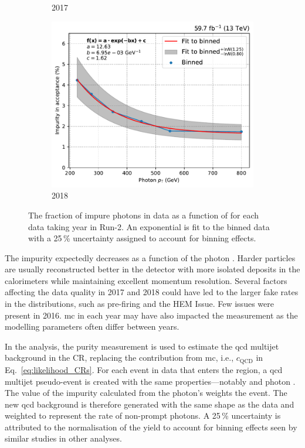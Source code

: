 \begin{figure}[ht]
\begin{subfigure}[b]{0.49\textwidth}
        \caption{2017}
    \end{subfigure}

    \begin{subfigure}[b]{0.49\textwidth}
        \includegraphics[width=\textwidth]{figures/photon_purity/2018/impurity_plot_2018.pdf}
        \caption{2018}
    \end{subfigure}
    \caption[The fraction of impure photons in data as a function of \pt for each data taking year in Run-2]{The fraction of impure photons in data as a function of \pt for each data taking year in Run-2. An exponential is fit to the binned data with a 25\,\% uncertainty assigned to account for binning effects.}
    \label{fig:htoinv_photon_impurity}
\end{figure}

The impurity expectedly decreases as a function of the photon \pt. Harder particles are usually reconstructed better in the detector with more isolated deposits in the calorimeters while maintaining excellent momentum resolution. Several factors affecting the data quality in 2017 and 2018 could have led to the larger fake rates in the distributions, such as pre-firing and the HEM Issue. Few issues were present in 2016. \acrlong{mc} in each year may have also impacted the measurement as the modelling parameters often differ between years.

In the analysis, the purity measurement is used to estimate the \acrshort{qcd} multijet background in the \singlePhotonCr \gls{CR}, replacing the contribution from \acrshort{mc}, i.e., $c_{\mathrm{QCD}}$ in Eq.~\ref{eq:likelihood_CRs}. For each event in data that enters the region, a \acrshort{qcd} multijet pseudo-event is created with the same properties---notably \ptmiss and photon \pt. The value of the impurity calculated from the photon's \pt weights the event. The new \acrshort{qcd} background is therefore generated with the same shape as the data and weighted to represent the rate of non-prompt photons. A 25\,\% uncertainty is attributed to the normalisation of the yield to account for binning effects seen by similar studies in other analyses.

